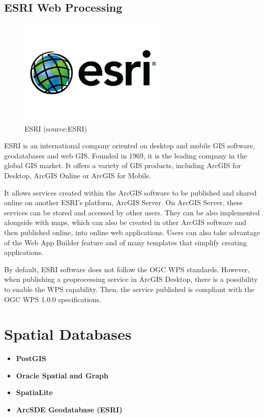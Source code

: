 \subsection{ESRI Web Processing}

\begin{figure}[H] \centering
      \includegraphics[width=200pt]{./pictures/esri.png}
      \caption[ESRI logo]{ESRI (source:ESRI)}
      \label{fig:ESRI}
  \end{figure}

ESRI is an international company oriented on desktop and mobile GIS software, geodatabases and web GIS. Founded in 1969, it is the leading company in the global GIS market. It offers a variety of GIS products, including ArcGIS for Desktop, ArcGIS Online or ArcGIS for Mobile. 

It allows services created within the ArcGIS software to be published and shared online on another ESRI's platform, ArcGIS Server. On ArcGIS Server, these services can be stored and accessed by other users. They can be also implemented alongside with maps, which can also be created in other ArcGIS software and then published online, into online web applications. Users can also take advantage of the Web App Builder feature and of many templates that simplify creating applications.

By default, ESRI software does not follow the OGC WPS standards. However, when publishing a geoprocessing service in ArcGIS Desktop, there is a possibility to enable the WPS capability. Then, the service published is compliant with the OGC WPS 1.0.0 specifications.

\section{Spatial Databases}



\begin{itemize}
\item \textbf{PostGIS}


	
\item \textbf{Oracle Spatial and Graph}
	
\item \textbf{SpatiaLite}

\item \textbf{ArcSDE Geodatabase (ESRI)}
	
\end{itemize}
